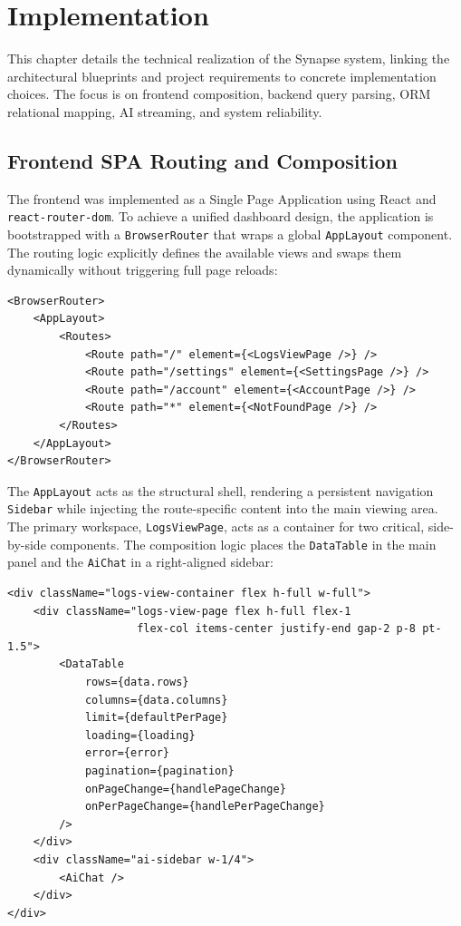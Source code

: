 \section{Implementation} \label{sec:implementation}
This chapter details the technical realization of the Synapse system, linking the architectural blueprints and project requirements to concrete implementation choices. The focus is on frontend composition, backend query parsing, ORM relational mapping, AI streaming, and system reliability.

\subsection{Frontend SPA Routing and Composition}
\begin{sloppypar}
    The frontend was implemented as a Single Page Application using React and
    \texttt{react\allowbreak-router\allowbreak-dom}. To achieve a unified dashboard design,
    the application is bootstrapped with a \texttt{BrowserRouter} that wraps a global
    \texttt{AppLayout} component. The routing logic explicitly defines the available
    views and swaps them dynamically without triggering full page reloads:
\end{sloppypar}

\begin{verbatim}
<BrowserRouter>
    <AppLayout>
        <Routes>
            <Route path="/" element={<LogsViewPage />} />
            <Route path="/settings" element={<SettingsPage />} />
            <Route path="/account" element={<AccountPage />} />
            <Route path="*" element={<NotFoundPage />} />
        </Routes>
    </AppLayout>
</BrowserRouter>
\end{verbatim}

The \texttt{AppLayout} acts as the structural shell, rendering a persistent navigation \texttt{Sidebar} while injecting the route-specific content into the main viewing area. The primary workspace, \texttt{LogsViewPage}, acts as a container for two critical, side-by-side components. The composition logic places the \texttt{DataTable} in the main panel and the \texttt{AiChat} in a right-aligned sidebar:

\begin{verbatim}
<div className="logs-view-container flex h-full w-full">
    <div className="logs-view-page flex h-full flex-1 
                    flex-col items-center justify-end gap-2 p-8 pt-1.5">
        <DataTable
            rows={data.rows}
            columns={data.columns}
            limit={defaultPerPage}
            loading={loading}
            error={error}
            pagination={pagination}
            onPageChange={handlePageChange}
            onPerPageChange={handlePerPageChange}
        />
    </div>
    <div className="ai-sidebar w-1/4">
        <AiChat />
    </div>
</div>
\end{verbatim}

